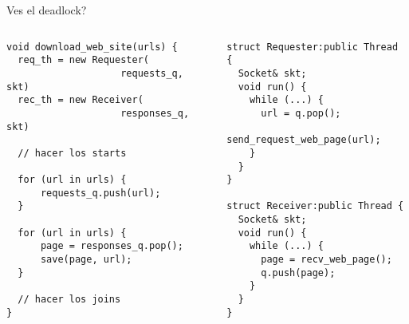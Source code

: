 \begin{frame}[fragile]{Ves el deadlock?}{}
    \begin{columns}[T]
      \begin{column}{.55\linewidth}
\begin{lstlisting}[style=normalnonumbers,linebackgroundcolor={%
                 \btLstHLB<1-6>{9-11}%
                 \btLstHLR<6>{9-11}%
                 }]
void download_web_site(urls) {
  req_th = new Requester(
                    requests_q, skt)
  rec_th = new Receiver(
                    responses_q, skt)

  // hacer los starts

  for (url in urls) {
      requests_q.push(url);
  }

  for (url in urls) {
      page = responses_q.pop();
      save(page, url);
  }

  // hacer los joins
}
\end{lstlisting}
      \end{column}
      \begin{column}{.50\linewidth}
\begin{lstlisting}[style=normalnonumbers,linebackgroundcolor={%
                 \btLstHLB<2>{5-6}%
                 \btLstHLB<3>{5-6,15-16}%
                 \btLstHLR<4>{15-16}%
                 \btLstHLR<5->{5-6,15-16}%
                 }]
struct Requester:public Thread {
  Socket& skt;
  void run() {
    while (...) {
      url = q.pop();
      send_request_web_page(url);
    }
  }
}

struct Receiver:public Thread {
  Socket& skt;
  void run() {
    while (...) {
      page = recv_web_page();
      q.push(page);
    }
  }
}
\end{lstlisting}
      \end{column}
    \end{columns}

\end{frame}
